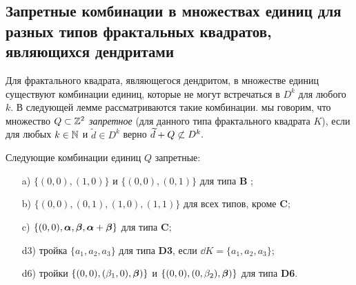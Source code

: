 \subsection{Запретные комбинации в множествах единиц для разных типов фрактальных квадратов, являющихся дендритами}

Для фрактального квадрата, являющегося дендритом, в множестве единиц существуют комбинации единиц, которые не могут встречаться в $D^k$ для любого $k$. 
В следующей лемме рассматриваются такие комбинации. 
мы говорим, что множество $Q\subset \mathbb{Z}^2$ {\em  запретное} (для данного типа фрактального квадрата $K$), если для любых $k\in\mathbb{N}$ и $\widetilde d\in D^k$ верно
$\widetilde d+Q\not\subset D^k.$

\begin{lemma}\label{quadruples}
Следующие комбинации единиц $Q$ запретные:
\begin{itemize}[nolistsep]
\item[a)] $\{(0,0), (1,0)\} $ и $\{(0,0), (0,1)\} $ для типа {\bf B} ;
\item[b)] $\{(0,0), (0,1), (1,0), (1,1)\}$ для всех типов, кроме {\bf C};
\item[c)] $\{(0,0),{\bm{\alpha}},{\bm{\beta}},{\bm{\alpha}}+{\bm{\beta}}\}$ для типа {\bf C};
\item[d3)] тройка $\{a_1, a_2, a_3\}$ для типа {\bf D3}, если $\dd K=\{a_1,a_2, a_3\}$;
\item[d6)] тройки $\{(0,0),(\beta_1,0),{\bm{\beta}})\}$ и $\{(0,0),(0,\beta_2),{\bm{\beta}})\}$ для типа {\bf D6}. 
\end{itemize}
\end{lemma}

